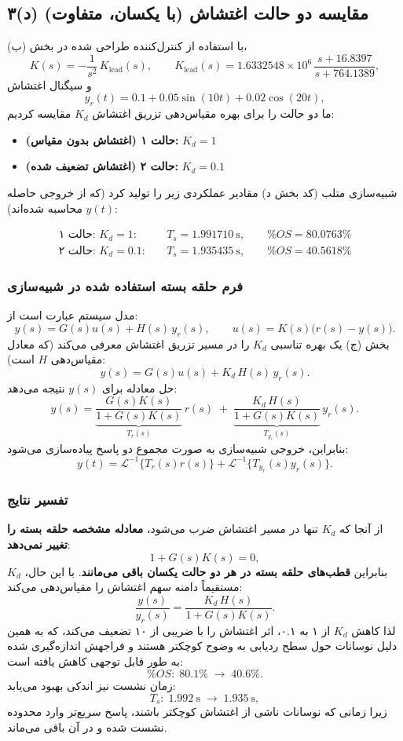 \documentclass[a4paper]{article}
\begin{document}
\subsection{۳(د) مقایسه دو حالت اغتشاش (با  یکسان،  متفاوت)}

با استفاده از کنترل‌کننده طراحی شده در بخش (ب)،
\[
K(s)= -\frac{1}{s^2}\,K_{\text{lead}}(s),
\qquad
K_{\text{lead}}(s)=1.6332548\times10^{6}\,\frac{s+16.8397}{s+764.1389},
\]
و سیگنال اغتشاش
\[
y_r(t)=0.1+0.05\sin(10t)+0.02\cos(20t),
\]
ما دو حالت را برای بهره مقیاس‌دهی تزریق اغتشاش $K_d$ مقایسه کردیم:

\begin{itemize}
	\item \textbf{حالت ۱ (اغتشاش بدون مقیاس):} $K_d=1$
	\item \textbf{حالت ۲ (اغتشاش تضعیف شده):} $K_d=0.1$
\end{itemize}

شبیه‌سازی متلب (کد بخش د) مقادیر عملکردی زیر را تولید کرد (که از خروجی حاصله $y(t)$ محاسبه شده‌اند):

\begin{align*}
	\textbf{حالت ۱: }K_d=1: \quad & T_s = 1.991710~\text{s}, \qquad \%OS = 80.0763\% \\
	\textbf{حالت ۲: }K_d=0.1: \quad & T_s = 1.935435~\text{s}, \qquad \%OS = 40.5618\%
\end{align*}

\subsubsection*{فرم حلقه بسته استفاده شده در شبیه‌سازی}
مدل سیستم عبارت است از:
\[
y(s)=G(s)u(s)+H(s)\,y_r(s), \qquad u(s)=K(s)\big(r(s)-y(s)\big).
\]
بخش (ج) یک بهره تناسبی $K_d$ را در مسیر تزریق اغتشاش معرفی می‌کند (که معادل مقیاس‌دهی $H$ است):
\[
y(s)=G(s)u(s)+K_d\,H(s)\,y_r(s).
\]
حل معادله برای $y(s)$ نتیجه می‌دهد:
\[
y(s)=\underbrace{\frac{G(s)K(s)}{1+G(s)K(s)}}_{T_r(s)}\,r(s)
\;+\;
\underbrace{\frac{K_d\,H(s)}{1+G(s)K(s)}}_{T_{y_r}(s)}\,y_r(s).
\]
بنابراین، خروجی شبیه‌سازی به صورت مجموع دو پاسخ پیاده‌سازی می‌شود:
\[
y(t)=\mathcal{L}^{-1}\{T_r(s)r(s)\}+\mathcal{L}^{-1}\{T_{y_r}(s)y_r(s)\}.
\]

\subsubsection*{تفسیر نتایج}
از آنجا که $K_d$ تنها در مسیر اغتشاش ضرب می‌شود، \textbf{معادله مشخصه حلقه بسته را تغییر نمی‌دهد}:
\[
1+G(s)K(s)=0,
\]
بنابراین \textbf{قطب‌های حلقه بسته در هر دو حالت یکسان باقی می‌مانند}. با این حال، $K_d$ مستقیماً دامنه سهم اغتشاش را مقیاس‌دهی می‌کند:
\[
\frac{y(s)}{y_r(s)}=\frac{K_d\,H(s)}{1+G(s)K(s)}.
\]
لذا کاهش $K_d$ از ۱ به ۰.۱، اثر اغتشاش را با ضریبی از ۱۰ تضعیف می‌کند، که به همین دلیل نوسانات حول سطح ردیابی به وضوح کوچکتر هستند و فراجهش اندازه‌گیری شده به طور قابل توجهی کاهش یافته است:
\[
\%OS:\; 80.1\% \;\rightarrow\; 40.6\%.
\]
زمان نشست نیز اندکی بهبود می‌یابد:
\[
T_s:\; 1.992~\text{s} \;\rightarrow\; 1.935~\text{s},
\]
زیرا زمانی که نوسانات ناشی از اغتشاش کوچکتر باشند، پاسخ سریع‌تر وارد محدوده نشست شده و در آن باقی می‌ماند.
\end{document}
